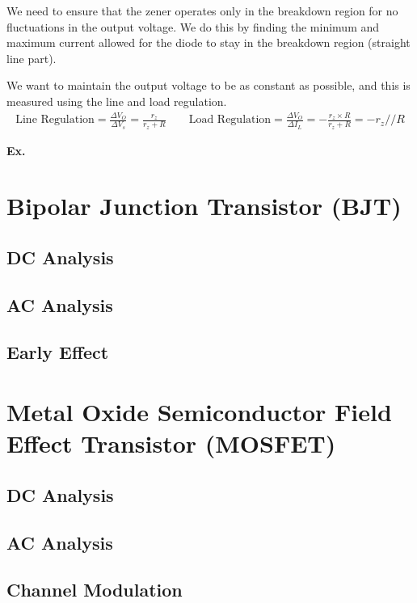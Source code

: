 \documentclass[12pt,letterpaper]{article} \usepackage{amsmath} \usepackage{graphicx} \usepackage[margin=1in]{geometry} \usepackage{longtable}  \usepackage{amssymb}
\begin{document}
	We need to ensure that the zener operates only in the breakdown region for no fluctuations in the output voltage. We do this by finding the minimum and maximum current allowed for the diode to stay in the breakdown region (straight line part).
	
	We want to maintain the output voltage to be as constant as possible, and this is measured using the line and load regulation. 
	\begin{align*}
		\text{Line Regulation}=\frac{\Delta V_O}{\Delta V_s} = \frac{r_z}{r_z+R} \qquad \text{Load Regulation}=\frac{\Delta V_O}{\Delta I_L} = -\frac{r_z\times R}{r_z+R} = -r_z // R
	\end{align*}

	\begin{mdframed}[]
	\textbf{Ex. }
	\end{mdframed}
	
	\section{Bipolar Junction Transistor (BJT)}
	
	\subsection{DC Analysis}
	
	\subsection{AC Analysis}
	
	\subsection{Early Effect}
	
	\section{Metal Oxide Semiconductor Field Effect Transistor (MOSFET)}
	
	\subsection{DC Analysis}
	
	\subsection{AC Analysis}
	
	\subsection{Channel Modulation}
	
\end{document}
